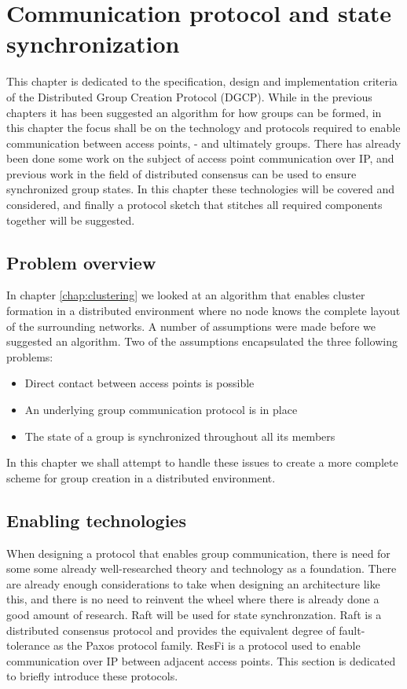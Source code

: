 \chapter{Communication protocol and state synchronization}
This chapter is dedicated to the specification, design and implementation criteria of the Distributed Group Creation Protocol (DGCP).
While in the previous chapters it has been suggested an algorithm for how groups can be formed, in this chapter the focus shall be on the technology and protocols required
to enable communication between access points, - and ultimately groups. There has already been done some work on the subject of access point communication over IP,
and previous work in the field of distributed consensus can be used to ensure synchronized group states. In this chapter these technologies will be covered and considered,
and finally a protocol sketch that stitches all required components together will be suggested. 


\section{Problem overview}
In chapter \ref{chap:clustering} we looked at an algorithm that enables cluster formation in a distributed environment where no node knows the complete layout of the surrounding networks.
A number of assumptions were made before we suggested an algorithm. Two of the assumptions encapsulated the three following problems:
\begin{itemize}
\item Direct contact between access points is possible
\item An underlying group communication protocol is in place
\item The state of a group is synchronized throughout all its members
\end{itemize}
In this chapter we shall attempt to handle these issues to create a more complete scheme for group creation in a distributed environment.

\section{Enabling technologies}
When designing a protocol that enables group communication, there is need for some some already well-researched theory and technology as a foundation. There are already enough
considerations to take when designing an architecture like this, and there is no need to reinvent the wheel where there is already done a good amount of research. 
Raft \cite{raftio} will be used for state synchronzation. Raft is a distributed consensus protocol and provides the equivalent degree of fault-tolerance as the Paxos \cite{lamport2001paxos} protocol family.
ResFi is a protocol used to enable communication over IP between adjacent access points. This section is dedicated to briefly introduce these protocols. 
